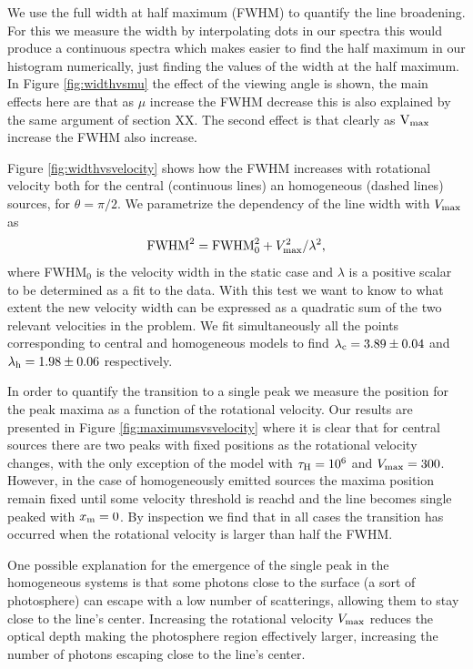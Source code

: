 \documentclass{emulateapj}
\newcommand{\kms}{{\ifmmode{{\mathrm{\,km\ s}^{-1}}}\else{\,km~s$^{-1}$}\fi}}
\begin{document}
We use the full width at half maximum (FWHM) to quantify the line
broadening. For this we measure the width by interpolating dots in 
our spectra this would produce a continuous spectra which makes easier
to find the half maximum in our histogram numerically, just finding the 
values of the width at the half maximum. In Figure \ref{fig:widthvsmu}
the effect of the viewing angle is shown, the main effects here are that 
as $\mu$ increase the FWHM decrease this is also explained by the same argument
of section XX. The second effect is that clearly as $\rm{V_{max}}$ increase 
the FWHM also increase.



 Figure \ref{fig:widthvsvelocity} shows how the FWHM increases
with rotational velocity both for the central (continuous lines) an 
homogeneous (dashed lines) sources, for $\theta=\pi/2$.
 We parametrize the dependency of the line width with
$V_{\rm max}$ as
\begin{equation}
 {\rm FWHM}^2 = {\rm FWHM}_{0}^2 + V_{\rm max}^2/\lambda^2,
\label{eq:fwhm}
\end{equation}
%
where FWHM$_{0}$ is the velocity width in the static case and $\lambda$ 
is a positive scalar to be determined as a fit to the data. 
With this test we want to know
to what extent the new velocity width can be expressed as a quadratic
sum of the two relevant velocities in the problem. We fit
simultaneously all the points corresponding to central and homogeneous
models to find $\lambda_{\rm c} = 3.89 \pm 0.04$ and $\lambda_{\rm h}=
1.98\pm 0.06$ respectively. 

In order to quantify the transition to a single peak we measure the
position for the peak maxima as a function of the rotational
velocity. Our results are presented in Figure
\ref{fig:maximumsvsvelocity} where it is clear that for central
sources there are two peaks with fixed positions as the rotational
velocity changes, with the only exception of the model with $\tau_{\rm
  H}=10^6$ and $V_{\rm max}=300$\kms. However, in the case of
homogeneously emitted sources the maxima position remain fixed until
some velocity threshold is reachd and the line becomes single peaked
with $x_{\rm m}=0$. By inspection we find that in all cases the
transition has occurred when the rotational velocity is larger than
half the FWHM. 

One possible explanation for the emergence of the single peak in the
homogeneous systems is that some photons close to the surface
(a sort of photosphere) can escape with a low number of scatterings,
allowing them to stay close to the line's center. Increasing the
rotational velocity $V_{\rm max}$ reduces the optical depth making the
photosphere region effectively larger, increasing the number of
photons escaping close to the line's center. 
\end{document}
